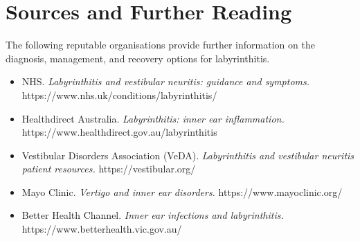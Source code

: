 \section*{Sources and Further Reading}
The following reputable organisations provide further information on the diagnosis, management, and recovery options for labyrinthitis.
\begin{itemize}
    \item NHS. \textit{Labyrinthitis and vestibular neuritis: guidance and symptoms.} https://www.nhs.uk/conditions/labyrinthitis/
    \item Healthdirect Australia. \textit{Labyrinthitis: inner ear inflammation.} https://www.healthdirect.gov.au/labyrinthitis
    \item Vestibular Disorders Association (VeDA). \textit{Labyrinthitis and vestibular neuritis patient resources.} https://vestibular.org/
    \item Mayo Clinic. \textit{Vertigo and inner ear disorders.} https://www.mayoclinic.org/
    \item Better Health Channel. \textit{Inner ear infections and labyrinthitis.} https://www.betterhealth.vic.gov.au/
\end{itemize}
